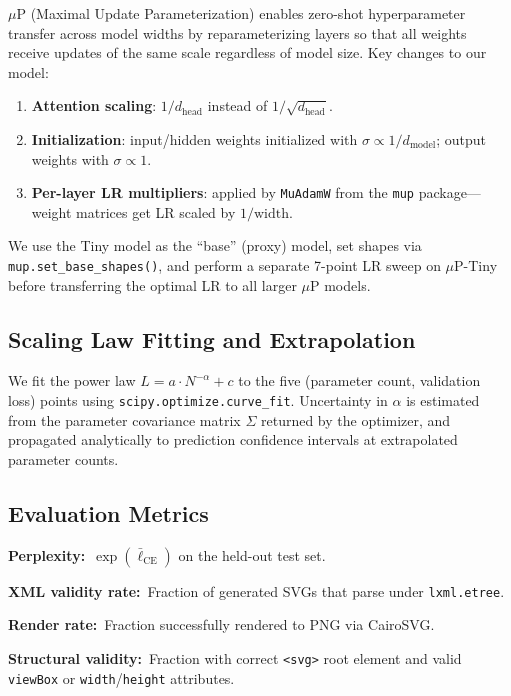 \documentclass[11pt,letterpaper]{article}
\begin{document}
$\mu$P (Maximal Update Parameterization) \cite{yang2022mup} enables zero-shot
hyperparameter transfer across model widths by reparameterizing layers so that all weights
receive updates of the same scale regardless of model size. Key changes to our model:

\begin{enumerate}[nosep]
  \item \textbf{Attention scaling}: $1/d_{\text{head}}$ instead of $1/\sqrt{d_{\text{head}}}$.
  \item \textbf{Initialization}: input/hidden weights initialized with $\sigma \propto 1/d_{\text{model}}$;
        output weights with $\sigma \propto 1$.
  \item \textbf{Per-layer LR multipliers}: applied by \texttt{MuAdamW} from the \texttt{mup}
        package—weight matrices get LR scaled by $1/\text{width}$.
\end{enumerate}

We use the Tiny model as the ``base'' (proxy) model, set shapes via
\texttt{mup.set\_base\_shapes()}, and perform a separate 7-point LR sweep on $\mu$P-Tiny
before transferring the optimal LR to all larger $\mu$P models.

\subsection{Scaling Law Fitting and Extrapolation}

We fit the power law $L = a \cdot N^{-\alpha} + c$ to the five
(parameter count, validation loss) points using \texttt{scipy.optimize.curve\_fit}.
Uncertainty in $\hat{\alpha}$ is estimated from the parameter covariance matrix $\Sigma$
returned by the optimizer, and propagated analytically to prediction confidence intervals
at extrapolated parameter counts.

\subsection{Evaluation Metrics}

\textbf{Perplexity:}~$\exp(\bar{\ell}_{\text{CE}})$ on the held-out test set.

\textbf{XML validity rate:}~Fraction of generated SVGs that parse under \texttt{lxml.etree}.

\textbf{Render rate:}~Fraction successfully rendered to PNG via CairoSVG.

\textbf{Structural validity:}~Fraction with correct \verb|<svg>| root element and valid
\texttt{viewBox} or \texttt{width}/\texttt{height} attributes.
\end{document}
